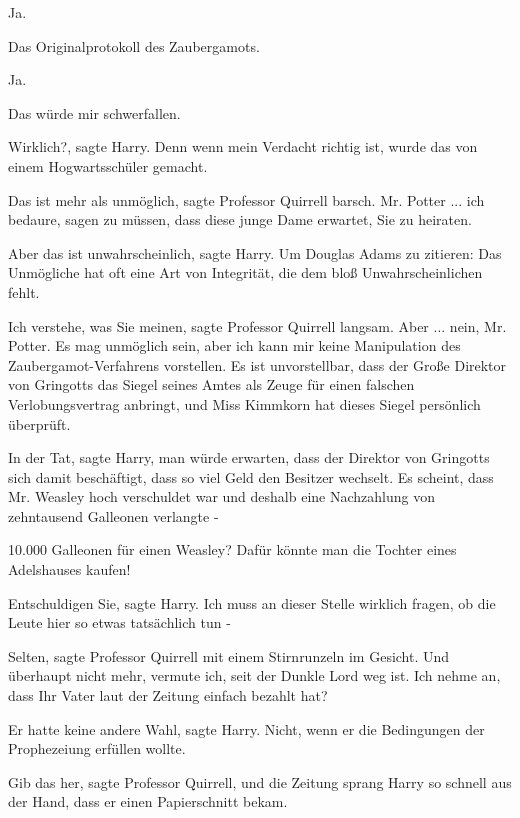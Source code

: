 \glqq{}Ja.\grqq{}

\glqq{}Das Originalprotokoll des Zaubergamots.\grqq{}

\glqq{}Ja.\grqq{}

\glqq{}Das würde mir schwerfallen.\grqq{}

\glqq{}Wirklich?\grqq{}, sagte Harry. \glqq{}Denn wenn mein Verdacht richtig
ist, wurde das von einem Hogwartsschüler gemacht.\grqq{}

\glqq{}Das ist mehr als unmöglich\grqq{}, sagte Professor Quirrell barsch.
\glqq{} Mr. Potter ... ich bedaure, sagen zu müssen, dass diese junge Dame
erwartet, Sie zu heiraten.\grqq{}

\glqq{}Aber das ist unwahrscheinlich\grqq{}, sagte Harry. \glqq{}Um Douglas
Adams zu zitieren: Das Unmögliche hat oft eine Art von Integrität, die dem bloß
Unwahrscheinlichen fehlt.\grqq{}

\glqq{}Ich verstehe, was Sie meinen\grqq{}, sagte Professor Quirrell langsam.
\glqq{}Aber ... nein, Mr. Potter. Es mag unmöglich sein, aber ich kann mir keine
Manipulation des Zaubergamot-Verfahrens vorstellen. Es ist unvorstellbar, dass
der Große Direktor von Gringotts das Siegel seines Amtes als Zeuge für einen
falschen Verlobungsvertrag anbringt, und Miss Kimmkorn hat dieses Siegel
persönlich überprüft.\grqq{}

\glqq{}In der Tat\grqq{}, sagte Harry, \glqq{}man würde erwarten, dass der
Direktor von Gringotts sich damit beschäftigt, dass so viel Geld den Besitzer
wechselt. Es scheint, dass Mr. Weasley hoch verschuldet war und deshalb eine
Nachzahlung von zehntausend Galleonen verlangte -\grqq{}

\glqq{}10.000 Galleonen für einen Weasley? Dafür könnte man die Tochter eines
Adelshauses kaufen!\grqq{}

\glqq{}Entschuldigen Sie\grqq{}, sagte Harry. \glqq{}Ich muss an dieser Stelle
wirklich fragen, ob die Leute hier so etwas tatsächlich tun -\grqq{}

\glqq{}Selten\grqq{}, sagte Professor Quirrell mit einem Stirnrunzeln im
Gesicht. \glqq{}Und überhaupt nicht mehr, vermute ich, seit der Dunkle Lord weg
ist. Ich nehme an, dass Ihr Vater laut der Zeitung einfach bezahlt hat?\grqq{}

\glqq{}Er hatte keine andere Wahl\grqq{}, sagte Harry. \glqq{}Nicht, wenn er die
Bedingungen der Prophezeiung erfüllen wollte.\grqq{}

\glqq{}Gib das her\grqq{}, sagte Professor Quirrell, und die Zeitung sprang
Harry so schnell aus der Hand, dass er einen Papierschnitt bekam.

